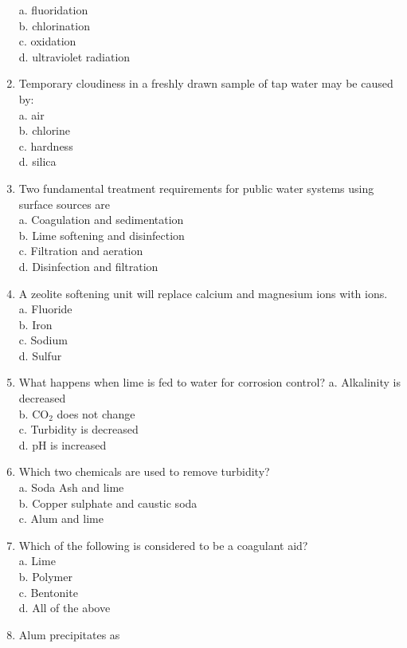 \begin{enumerate}
a. fluoridation\\
b. chlorination\\
c. oxidation\\
d. ultraviolet radiation\\
\item Temporary cloudiness in a freshly drawn sample of tap water may be caused by:\\
a. air\\
b. chlorine\\
c. hardness\\
d. silica\\
\item Two fundamental treatment requirements for public water systems using surface sources are\\
a. Coagulation and sedimentation\\
b. Lime softening and disinfection\\
c. Filtration and aeration\\
d. Disinfection and filtration\\
\item A zeolite softening unit will replace calcium and magnesium ions with ions.\\
a. Fluoride\\
b. Iron\\
c. Sodium\\
d. Sulfur\\
\item What happens when lime is fed to water for corrosion control? a. Alkalinity is decreased\\
b. $\mathrm{CO}_{2}$ does not change\\
c. Turbidity is decreased\\
d. $\mathrm{pH}$ is increased\\
\item Which two chemicals are used to remove turbidity?\\
a. Soda Ash and lime\\
b. Copper sulphate and caustic soda\\
c. Alum and lime\\
\item Which of the following is considered to be a coagulant aid?\\
a. Lime\\
b. Polymer\\
c. Bentonite\\
d. All of the above\\
\item Alum precipitates as\\

\end{enumerate}

